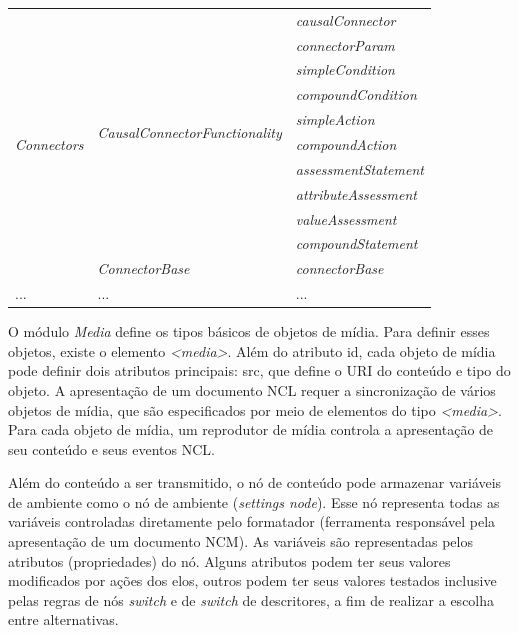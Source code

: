 \begin{table}[!ht]
{\begin{tabular}{|p{4.5cm}|p{6cm}|p{4cm}|}
   \multirow{11}{*}{\textit{Connectors}} & \multirow{10}{*}{\textit{CausalConnectorFunctionality}} & \textit{causalConnector
}\\\cline{3-3}&&
   \textit{connectorParam}\\\cline{3-3} && \textit{simpleCondition}\\\cline {3-3} && \textit{
compoundCondition}\\\cline{3-3} && \textit{
simpleAction}\\\cline{3-3} &&
   \textit{compoundAction}\\\cline{3-3} && \textit{assessmentStatement}\\\cline{3-3} &&
   \textit{attributeAssessment}\\\cline{3-3} && \textit{valueAssessment}\\\cline{3-3} &&
   \textit{compoundStatement}\\\cline{2-3} & \textit{ConnectorBase} & \textit{connectorBase} \\\hline
  
   ... & ... & ... \\\hline
   
   
  \end{tabular}
}
\end{table}

O módulo \textit{Media} define os tipos básicos de objetos de mídia. Para definir esses objetos, existe o elemento \textit{<media>}. Além do atributo id, cada objeto de mídia pode definir dois atributos principais: src, que define o URI do conteúdo e tipo do objeto. A apresentação de um documento NCL requer a sincronização de vários objetos de mídia, que são especificados por meio de elementos do tipo \textit{<media>}. Para cada objeto de mídia, um reprodutor de mídia controla a apresentação de seu conteúdo e seus eventos NCL.

Além do conteúdo a ser transmitido, o nó de conteúdo pode armazenar variáveis de ambiente como o nó de ambiente (\textit{settings node}). Esse nó representa todas as variáveis controladas diretamente pelo formatador (ferramenta responsável pela apresentação de um documento NCM). As variáveis são representadas pelos atributos (propriedades) do nó. Alguns atributos podem ter seus valores modificados por ações dos elos, outros podem ter seus valores testados inclusive pelas regras de nós \textit{switch} e de \textit{switch} de descritores, a fim de realizar a escolha entre alternativas. 

